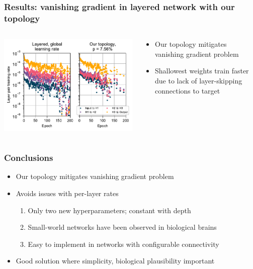 \documentclass[pdf]{beamer}
\begin{document}
\begin{frame}
	\frametitle{Results: vanishing gradient in layered network with our topology}
	\begin{columns}
	\begin{column}{.6\textwidth}
		\includegraphics[width=\textwidth]{figures/perlayer_global+ours.pdf}
	\end{column}
	\begin{column}{.4\textwidth}
		\begin{itemize}
			\item Our topology mitigates vanishing gradient problem
			\item Shallowest weights train faster due to lack of layer-skipping connections to target
		\end{itemize}
	\end{column}
	\end{columns}
\end{frame}

\begin{frame}
	\frametitle{Conclusions}
	\begin{itemize}
		\item<1-> Our topology mitigates vanishing gradient problem
		\item<2-> Avoids issues with per-layer rates
		\begin{enumerate}
			\item<3-> Only two new hyperparameters; constant with depth
			\item<4-> Small-world networks have been observed in biological brains
			\item<5-> Easy to implement in networks with configurable connectivity
		\end{enumerate}
		\item<6-> Good solution where simplicity, biological plausibility important
	\end{itemize}
\end{frame}
\end{document}
